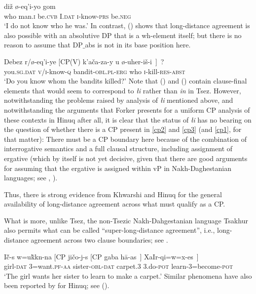 \documentclass[output=paper
,modfonts
,nonflat]{langsci/langscibook}
\begin{document}
 \ea\label{ex:mueller:19} 
\gll{} di\v{z} \o -eq'i-yo gom \\
  {} who man.{\scshape i} be.{\scshape cvb} I.{\scshape dat} {\scshape i}-know-{\scshape prs}  be.{\scshape neg} \\ 
\glt `I do not know who he was.'
\z
In contrast, (\Next) shows that long-distance agreement is also possible with
an absolutive DP that is a wh-element itself; but there is no reason
to assume that DP$\_${abs} is not in its base position here. 

\ea\label{ex:mueller:20} \label{cp3}
  \gll Debez r/\o -eq'i-ye [CP(V) k'a\v{c}a\textgamma -za-y \textbeltl u \o -uher-i\v{s}-\textbeltl i~]~? \\
  you.{\scshape sg.dat} {\scshape v/i}-know-{\scshape q} {} bandit-{\scshape obl.pl-erg}   who {\scshape i}-kill-{\scshape res-abst} \\ 
 \glt `Do you know whom the bandits killed?'
\z
Note that (\LLast) and (\Last) contain clause-final elements that
would seem to correspond to {\itshape {\l}i} rather than  {\it
  \textcrlambda in} in Tsez. However, notwithstanding the problems
raised by  analysis of {\itshape {\l}i}
mentioned above, and notwithstanding the arguments that Forker
presents for a uniform CP analysis of these contexts in Hinuq after
all, it is clear that the status of {\itshape {\l}i} has no bearing on the
question of whether there is a CP present in \ref{cp2} and \ref{cp3}
(and \ref{cp1}, for that matter): There must be a CP boundary here
because of the combination of interrogative semantics and a full
clausal structure, including assignment of ergative (which by itself
is not yet decisive, given that there are good arguments for assuming
that the ergative is assigned within vP in Nakh-Daghestanian
languages; see \cite{Gagliardietal:14}, \cite{Polinsky:16:arc}). 

Thus, there is strong evidence from Khwarshi and Hinuq for the general
availability of long-distance agreement across what must qualify as a
CP.

What is more, unlike Tsez, the non-Tsezic Nakh-Dahgestanian language
Tsakhur  also permits what can be called
``super-long-distance agreement'', i.e., long-distance agreement 
across two clause boundaries; see \cite{Kibrik:99}.

\ea\label{ex:mueller:21} \label{tsa1}
\gll I\v{c}\={\textsci}-s w=u\={k}\={\textsci}k\textbari n-na [CP ji\v{c}o-j-s [CP gaba  h\={a}\textglotstop-as~] XaIr-qi=w=x-es~] \\
     girl-\textsc{dat} {3}=want.\textsc{pf-{aa}} {} sister-\textsc{obl-dat} {} {carpet.3} 3.do-\textsc{pot} learn-{3}=become-\textsc{pot} \\
\glt `The girl wants her sister to learn to make a carpet.'
\z
Similar phenomena have also been reported by \cite{Forker:11} for
Hinuq; see (\Next).
\end{document}
